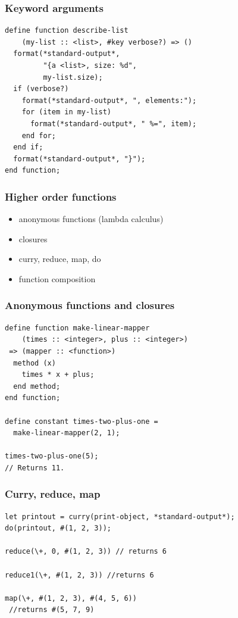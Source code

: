 \documentclass[compress]{beamer}
\begin{document}

\begin{frame}[fragile]
  \frametitle{Keyword arguments}
  \begin{verbatim}
define function describe-list
    (my-list :: <list>, #key verbose?) => ()
  format(*standard-output*,
         "{a <list>, size: %d",
         my-list.size);
  if (verbose?)
    format(*standard-output*, ", elements:");
    for (item in my-list)
      format(*standard-output*, " %=", item);
    end for;
  end if;
  format(*standard-output*, "}");
end function;
  \end{verbatim}
\end{frame}

\begin{frame}
  \frametitle{Higher order functions}
  \begin{itemize}
  \item anonymous functions (lambda calculus)
  \item closures
  \item curry, reduce, map, do
  \item function composition
  \end{itemize}
\end{frame}

\begin{frame}[fragile]
  \frametitle{Anonymous functions and closures}
  \begin{verbatim}
define function make-linear-mapper
    (times :: <integer>, plus :: <integer>)
 => (mapper :: <function>)
  method (x)
    times * x + plus;
  end method;
end function;

define constant times-two-plus-one =
  make-linear-mapper(2, 1);

times-two-plus-one(5);
// Returns 11.
  \end{verbatim}
\end{frame}

\begin{frame}[fragile]
  \frametitle{Curry, reduce, map}
  \begin{verbatim}
let printout = curry(print-object, *standard-output*);
do(printout, #(1, 2, 3));

reduce(\+, 0, #(1, 2, 3)) // returns 6

reduce1(\+, #(1, 2, 3)) //returns 6

map(\+, #(1, 2, 3), #(4, 5, 6))
 //returns #(5, 7, 9)
  \end{verbatim}
\end{frame}
\end{document}

